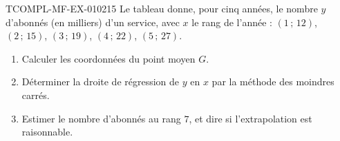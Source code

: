 \begin{exercice}{TCOMPL-MF-EX-010}{2}{15}
Le tableau donne, pour cinq années, le nombre $y$ d'abonnés (en milliers)
d'un service, avec $x$ le rang de l'année :
$(1\,;\,12)$, $(2\,;\,15)$, $(3\,;\,19)$, $(4\,;\,22)$, $(5\,;\,27)$.
\begin{enumerate}
  \item Calculer les coordonnées du point moyen $G$.
  \item Déterminer la droite de régression de $y$ en $x$ par la méthode des
        moindres carrés.
  \item Estimer le nombre d'abonnés au rang $7$, et dire si l'extrapolation
        est raisonnable.
\end{enumerate}
\end{exercice}
